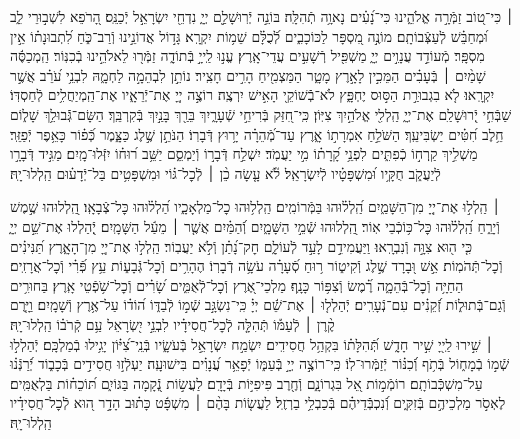 \documentclass[twoside, openany, parskip=half, 11pt]{book}
\begin{document}
 ׀
כִּי־ט֭וֹב זַמְּֿרָ֣ה אֱלֹהֵ֑ינוּ כִּי־נָ֝עִ֗ים נָאוָ֥ה תְֿהִלָּֽה׃
בּוֹנֵ֣ה יְֿרֽוּשָׁלַ֣‍ִם יְיָ֑ נִדְחֵ֖י יִשְׂרָאֵ֣ל יְֿכַנֵּֽס׃
הָ֭רֹפֵא לִשְׁב֣וּרֵי לֵ֑ב וּ֝מְחַבֵּ֗שׁ לְֿעַצְּֿבוֹתָֽם׃
מוֹנֶ֣ה מִ֭סְפָּר לַכּוֹכָבִ֑ים לְֿ֝כֻלָּ֗ם שֵׁמ֥וֹת יִקְרָֽא׃
גָּד֣וֹל אֲדוֹנֵ֣ינוּ וְֿרַב־כֹּ֑חַ  לִ֝תְבוּנָת֗וֹ אֵ֣ין מִסְפָּֽר׃ 
מְֿעוֹדֵ֣ד עֲנָוִ֣ים יְיָ֑  מַשְׁפִּ֖יל רְֿשָׁעִ֣ים עֲדֵי־אָֽרֶץ׃
עֱנ֣וּ לַֽייָ֣ בְּֿתוֹדָ֑ה  זַמְּֿר֖וּ לֵאלֹהֵ֣ינוּ בְֿכִנּֽוֹר׃
הַֽמְכַסֶּ֬ה שָׁמַ֨יִם ׀ בְּֿעָבִ֗ים  הַמֵּכִ֣ין לָאָ֣רֶץ מָטָ֑ר הַמַּצְמִ֖יחַ הָרִ֣ים חָצִֽיר׃
נוֹתֵ֣ן לִבְהֵמָ֣ה לַחְמָ֑הּ לִבְנֵ֥י עֹ֝רֵ֗ב אֲשֶׁ֣ר יִקְרָֽאוּ׃
לֹ֤א בִגְבוּרַ֣ת הַסּ֣וּס יֶחְפָּ֑ץ  לֹא־בְֿֿשׁוֹקֵ֖י הָאִ֣ישׁ יִרְצֶֽה׃
רוֹצֶ֣ה יְיָ֭ אֶת־יְֿרֵאָ֑יו אֶת־הַֽמְיַחֲלִ֥ים לְֿחַסְדּֽוֹ׃
שַׁבְּֿחִ֣י יְֿ֭רוּשָׁלַ‍ִם אֶת־יְיָ֑ הַֽלְלִ֖י אֱלֹהַ֣יִךְ צִיּֽוֹן׃
כִּֽי־חִ֭זַּק בְּֿרִיחֵ֣י שְֿׁעָרָ֑יִךְ בֵּרַ֖ךְ בָּנַ֣יִךְ בְּֿקִרְבֵּֽךְ׃
הַשָּׂם־גְּֿֿבוּלֵ֥ךְ שָׁל֑וֹם חֵ֥לֶב חִ֝טִּ֗ים יַשְׂבִּיעֵֽךְ׃
הַשֹּׁלֵ֣חַ אִמְרָת֣וֹ אָ֑רֶץ עַד־מְֿ֝הֵרָ֗ה יָר֥וּץ דְּֿבָרֽוֹ׃
הַנֹּתֵ֣ן שֶׁ֣לֶג כַּצָּ֑מֶר כְּֿ֝פ֗וֹר כָּאֵ֥פֶר יְֿפַזֵּֽר׃
מַשְׁלִ֣יךְ קַֽרְח֣וֹ כְֿפִתִּ֑ים לִפְנֵ֥י קָ֝רָת֗וֹ מִ֣י יַעֲמֹֽד׃
יִשְׁלַ֣ח דְּֿבָר֣וֹ וְֿיַמְסֵ֑ם יַשֵּׁ֥ב ר֝וּח֗וֹ יִזְּֿלוּ־מָֽיִם׃
מַגִּ֣יד דְּֿבָרָ֣ו לְֿיַעֲקֹ֑ב חֻקָּ֥יו וּ֝מִשְׁפָּטָ֗יו לְֿיִשְׂרָאֵֽל׃
לֹ֘א עָ֤שָׂה כֵ֨ן ׀ לְֿכׇל־גּ֗וֹי וּמִשְׁפָּטִ֥ים בַּל־יְֿדָע֗וּם  הַֽלְלוּ־יָֽהּ׃


 ׀
הַֽלְל֣וּ אֶת־יְיָ֭ מִן־הַשָּׁמַ֑יִם הַֽ֝לְל֗וּהוּ בַּמְּֿרוֹמִֽים׃
הַֽלְל֥וּהוּ כׇל־מַלְאָכָ֑יו הַ֝לְל֗וּהוּ כׇּל־צְֿבָאָֽו׃
הַֽ֭לְלוּהוּ שֶׁ֣מֶשׁ וְֿיָרֵ֑חַ הַֽ֝לְל֗וּהוּ כׇּל־כּ֥וֹכְֿבֵי אֽוֹר׃
הַֽ֭לְלוּהוּ שְֿׁמֵ֣י הַשָּׁמָ֑יִם וְֿ֝הַמַּ֗יִם אֲשֶׁ֤ר ׀ מֵעַ֬ל הַשָּׁמָֽיִם׃
יְֽֿ֭הַלְלוּ אֶת־שֵׁ֣ם יְיָ֑ כִּ֤י ה֖וּא צִוָּ֣ה וְֿנִבְרָֽאוּ׃
וַיַּעֲמִידֵ֣ם לָעַ֣ד לְֿעוֹלָ֑ם חׇק־נָ֝תַ֗ן וְֿלֹ֣א יַעֲבֽוֹר׃
הַֽלְל֣וּ אֶת־יְיָ֭ מִן־הָאָ֑רֶץ תַּ֝נִּינִ֗ים וְֿכׇל־תְּֿהֹמֽוֹת׃
אֵ֣שׁ וּ֭בָרָד שֶׁ֣לֶג וְֿקִיט֑וֹר ר֥וּחַ סְֿ֝עָרָ֗ה עֹשָׂ֥ה דְֿבָרֽוֹ׃
הֶהָרִ֥ים וְֿכׇל־גְּֿבָע֑וֹת עֵ֥ץ פְּֿ֝רִ֗י וְֿכׇל־אֲרָזִֽים׃
הַחַיָּ֥ה וְֿכׇל־בְּֿהֵמָ֑ה רֶ֗֝מֶשׂ וְֿצִפּ֥וֹר כָּנָֽף׃
מַלְכֵי־אֶ֭רֶץ וְֿכׇל־לְֿאֻמִּ֑ים שָׂ֝רִ֗ים וְֿכׇל־שֹׁ֥פְֿטֵי אָֽרֶץ׃
בַּחוּרִ֥ים וְֿגַם־בְּֿתוּל֑וֹת זְֿ֝קֵנִ֗ים עִם־נְֿעָרִֽים׃
יְֿהַלְל֤וּ ׀ אֶת־שֵׁ֬ם יְיָ֗ כִּֽי־נִשְׂגָּ֣ב שְֿׁמ֣וֹ לְֿבַדּ֑וֹ
ה֝וֹד֗וֹ עַל־אֶ֥רֶץ וְֿשָׁמָֽיִם׃ וַיָּ֤רֶם קֶ֨רֶן ׀ לְֿעַמּ֡וֹ תְּֿהִלָּ֤ה לְֽֿכׇל־חֲסִידָ֗יו
לִבְנֵ֣י יִ֭שְׂרָאֵל עַ֥ם קְֿרֹב֗וֹ הַֽלְלוּ־יָֽהּ׃\\
 ׀ 
שִׁ֣ירוּ לַֽייָ֭ שִׁ֣יר חָדָ֑שׁ  תְּֿ֝הִלָּת֗וֹ בִּקְהַ֥ל חֲסִידִֽים׃ 
יִשְׂמַ֣ח יִשְׂרָאֵ֣ל בְּֿעֹשָׂ֑יו  בְּֿנֵֽי־צִ֝יּ֗וֹן יָגִ֥ילוּ בְֿמַלְכָּֽם׃ 
יְֿהַלְל֣וּ שְֿׁמ֣וֹ בְֿמָח֑וֹל  בְּֿתֹ֥ף וְֿ֝כִנּ֗וֹר יְֿזַמְּֿרוּ־לֽוֹ׃ 
כִּֽי־רוֹצֶ֣ה יְיָ֣ בְּֿעַמּ֑וֹ יְֿפָאֵ֥ר עֲ֝נָוִ֗ים בִּישׁוּעָֽה׃ 
יַעְלְֿז֣וּ חֲסִידִ֣ים בְּֿכָב֑וֹד יְֿ֝רַנְּֿנ֗וּ עַל־מִשְׁכְּֿֿבוֹתָֽם׃
רוֹמְֿמ֣וֹת אֵ֭ל בִּגְרוֹנָ֑ם וְֿחֶ֖רֶב פִּיפִיּ֣וֹת בְּֿיָדָֽם׃
לַעֲשׂ֣וֹת נְֿ֭קָמָה בַּגּוֹיִ֑ם תּ֝וֹכֵח֗וֹת בַּלְאֻמִּֽים׃
לֶאְסֹ֣ר מַלְכֵיהֶ֣ם בְּֿזִקִּ֑ים וְֿ֝נִכְבְּֿֿדֵיהֶ֗ם בְּֿכַבְלֵ֥י בַרְזֶֽל׃
לַעֲשׂ֤וֹת בָּהֶ֨ם ׀ מִשְׁפָּ֬ט כָּת֗וּב הָדָ֣ר ה֭וּא לְֿכׇל־חֲסִידָ֗יו הַֽלְלוּ־יָֽהּ׃ 
\end{document}
